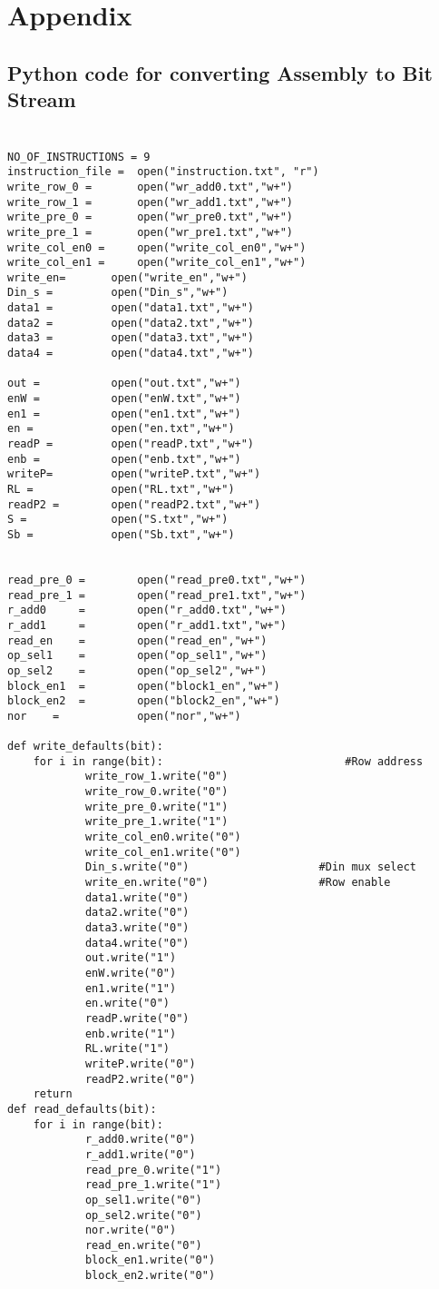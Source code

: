 \def\code#1{\texttt{#1}}
\chapter{Appendix}
\label{chap:intro}
\vspace{-0.2 cm}



\section{ Python code for converting Assembly to Bit Stream}

\paragraph{}
\begin{lstlisting}

NO_OF_INSTRUCTIONS = 9
instruction_file = 	open("instruction.txt", "r") 
write_row_0 =	 	open("wr_add0.txt","w+")
write_row_1 =	 	open("wr_add1.txt","w+")
write_pre_0 =		open("wr_pre0.txt","w+")
write_pre_1 =		open("wr_pre1.txt","w+")
write_col_en0 =		open("write_col_en0","w+")
write_col_en1 =		open("write_col_en1","w+")
write_en=		open("write_en","w+")
Din_s =			open("Din_s","w+")
data1 =			open("data1.txt","w+")
data2 =			open("data2.txt","w+")
data3 =			open("data3.txt","w+")
data4 =			open("data4.txt","w+")

out =	 		open("out.txt","w+")
enW =	 		open("enW.txt","w+")
en1 =			open("en1.txt","w+")
en =			open("en.txt","w+")
readP =			open("readP.txt","w+")
enb =			open("enb.txt","w+")
writeP=			open("writeP.txt","w+")
RL =			open("RL.txt","w+")
readP2 =		open("readP2.txt","w+")
S =				open("S.txt","w+")
Sb =			open("Sb.txt","w+")


read_pre_0 =		open("read_pre0.txt","w+")
read_pre_1 =		open("read_pre1.txt","w+")
r_add0     =		open("r_add0.txt","w+")
r_add1     =		open("r_add1.txt","w+")
read_en	   = 		open("read_en","w+")
op_sel1	   =		open("op_sel1","w+")
op_sel2	   =		open("op_sel2","w+")
block_en1  =		open("block1_en","w+")
block_en2  =		open("block2_en","w+")
nor	   = 			open("nor","w+")

def write_defaults(bit):
	for i in range(bit):							#Row address
			write_row_1.write("0")
			write_row_0.write("0")
			write_pre_0.write("1")
			write_pre_1.write("1")	
			write_col_en0.write("0")
			write_col_en1.write("0")
			Din_s.write("0")					#Din mux select
			write_en.write("0")					#Row enable		
			data1.write("0")
			data2.write("0")
			data3.write("0")
			data4.write("0")	
			out.write("1")
			enW.write("0")
			en1.write("1")
			en.write("0")
			readP.write("0")
			enb.write("1")
			RL.write("1")
			writeP.write("0")
			readP2.write("0")
	return
def read_defaults(bit):
	for i in range(bit):							
			r_add0.write("0")
			r_add1.write("0")
			read_pre_0.write("1")
			read_pre_1.write("1")	
			op_sel1.write("0")
			op_sel2.write("0")
			nor.write("0")						
			read_en.write("0")							
			block_en1.write("0")
			block_en2.write("0")
				

\end{lstlisting}
